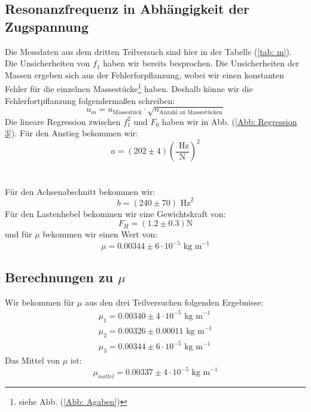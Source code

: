 \documentclass[bibliography=totocnumbered]{scrartcl}
\begin{document}
	\subsection{Resonanzfrequenz in Abhängigkeit der Zugspannung}
	
Die Messdaten aus dem dritten Teilversuch sind hier in der Tabelle (\ref{tab: m}). Die Unsicherheiten von $ f_{1} $ haben wir bereits besprochen. Die Unsicherheiten der Massen ergeben sich aus der Fehlerforpflanzung, wobei wir einen konstanten Fehler für die einzelnen Massestücke\footnote{siehe Abb. (\ref{Abb: Agaben})} haben. Deshalb könne wir die Fehlerfortpflanzung folgendermaßen schreiben:
\begin{equation}
	u_{m}=u_{\text{Massestück}}\cdot \sqrt{n_{\text{Anzahl an Massestücken}}}
\end{equation}
	Die lineare Regression zwischen $ f_{1}^{2} $ und $ F_{0} $ haben wir in Abb. (\ref{Abb: Regression 3}). Für den Anstieg bekommen wir: 
	\begin{equation}\label{eq: Anstieg 3}
		a=(202\pm 4)\left(\dfrac{\text{ Hz}}{\text{N}}\right)^{2}
	\end{equation}
\\\\
	Für den Achsenabschnitt bekommen wir:
	\begin{equation}\label{eq: Achsenabschnitt 3}
		b=( 240\pm 70)\text{ Hz}^{2}
	\end{equation}
	Für den Lastenhebel bekommen wir eine Gewichtskraft von:
	\begin{equation}
		F_{H}=(1.2\pm0.3)\text{N}
	\end{equation}	
	und für $ \mu $ bekommen wir einen Wert von:
	\begin{equation}
		\mu = 0.00344\pm6\cdot 10^{-5} \text{ kg m}^{-1}
	\end{equation}
	
	\subsection{Berechnungen zu $ \mu $}
	Wir bekommen für $ \mu $ aus den drei Teilversuchen folgenden Ergebnisse:
	\begin{align}
		\mu_{1}=0.00340\pm 4\cdot 10^{-5}\text{ kg m}^{-1}\\
		\mu_{2}=0.00326\pm0.00011\text{ kg m}^{-1}\\
		\mu_{3}=0.00344\pm6\cdot 10^{-5}\text{ kg m}^{-1}
	\end{align}
Das Mittel von $ \mu $ ist:
 \begin{equation}
 	\mu_{mittel} = 0.00337\pm 4\cdot 10^{-5}\text{ kg m}^{-1}
 \end{equation}
	
\end{document}
